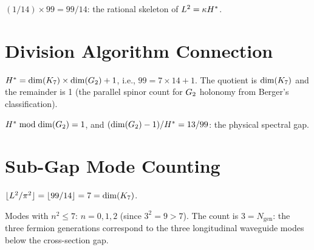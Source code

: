 \begin{theorem}[$\kappa \times \Hstar = L^2/\pi^2$]\label{thm:kappa_H_star}
    \leanok
    $(1/14) \times 99 = 99/14$: the rational skeleton of $L^2 = \kappa H^*$.
\end{theorem}

\section{Division Algorithm Connection}

\begin{theorem}\label{thm:euclidean_div}
    \leanok
    $H^* = \mathrm{dim}(K_7) \times \mathrm{dim}(G_2) + 1$, i.e., $99 = 7 \times 14 + 1$.
    The quotient is $\mathrm{dim}(K_7)$ and the remainder is 1 (the parallel spinor count
    for $G_2$ holonomy from Berger's classification).
\end{theorem}

\begin{theorem}[Remainder $=$ spinor correction]\label{thm:remainder_spinor}
    \leanok
    $H^* \bmod \mathrm{dim}(G_2) = 1$, and
    $(\mathrm{dim}(G_2) - 1)/H^* = 13/99$: the physical spectral gap.
\end{theorem}

\section{Sub-Gap Mode Counting}

\begin{theorem}[Sub-gap threshold $= \opdim(\Kseven)$]\label{thm:subgap_threshold}
    \leanok
    $\lfloor L^2/\pi^2 \rfloor = \lfloor 99/14 \rfloor = 7 = \mathrm{dim}(K_7)$.
\end{theorem}

\begin{theorem}[Sub-gap mode count $= N_{\mathrm{gen}}$]\label{thm:subgap_Ngen}
    \leanok
    Modes with $n^2 \le 7$: $n = 0, 1, 2$ (since $3^2 = 9 > 7$).
    The count is $3 = N_{\mathrm{gen}}$: the three fermion generations correspond
    to the three longitudinal waveguide modes below the cross-section gap.
\end{theorem}

